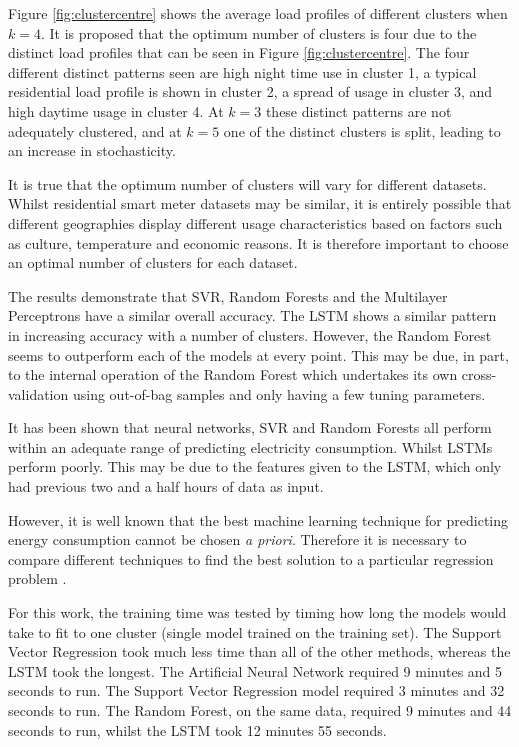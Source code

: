 Figure \ref{fig:clustercentre} shows the average load profiles of different clusters when $k=4$. It is proposed that the optimum number of clusters is four due to the distinct load profiles that can be seen in Figure \ref{fig:clustercentre}. The four different distinct patterns seen are high night time use in cluster 1, a typical residential load profile is shown in cluster 2, a spread of usage in cluster 3, and high daytime usage in cluster 4. At $k=3$ these distinct patterns are not adequately clustered, and at $k=5$ one of the distinct clusters is split, leading to an increase in stochasticity.

It is true that the optimum number of clusters will vary for different datasets. Whilst residential smart meter datasets may be similar, it is entirely possible that different geographies display different usage characteristics based on factors such as culture, temperature and economic reasons. It is therefore important to choose an optimal number of clusters for each dataset.

The results demonstrate that SVR, Random Forests and the Multilayer Perceptrons have a similar overall accuracy. The LSTM shows a similar pattern in increasing accuracy with a number of clusters. However, the Random Forest seems to outperform each of the models at every point. This may be due, in part, to the internal operation of the Random Forest which undertakes its own cross-validation using out-of-bag samples and only having a few tuning parameters. 

It has been shown that neural networks, SVR and Random Forests all perform within an adequate range of predicting electricity consumption. Whilst LSTMs perform poorly. This may be due to the features given to the LSTM, which only had previous two and a half hours of data as input. 

However, it is well known that the best machine learning technique for predicting energy consumption cannot be chosen \textit{a priori}. Therefore it is necessary to compare different techniques to find the best solution to a particular regression problem \cite{Ahmad2017}.

For this work, the training time was tested by timing how long the models would take to fit to one cluster (single model trained on the training set). The Support Vector Regression took much less time than all of the other methods, whereas the LSTM took the longest. The Artificial Neural Network required 9 minutes and 5 seconds to run. The Support Vector Regression model required 3 minutes and 32 seconds to run. The Random Forest, on the same data, required 9 minutes and 44 seconds to run, whilst the LSTM took 12 minutes 55 seconds. 


